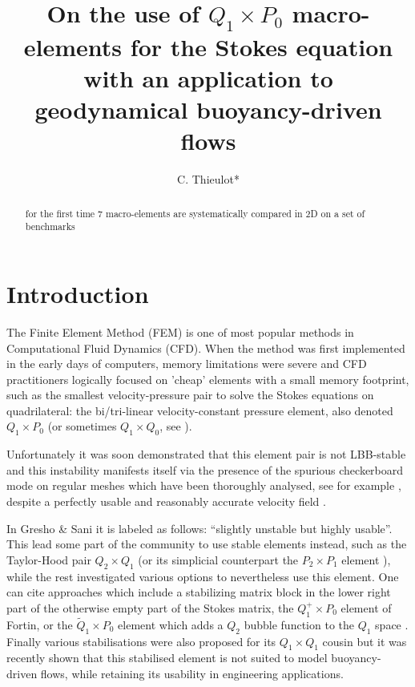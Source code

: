 \documentclass[a4paper]{article}
\title{
On the use of $Q_1\times P_0$ macro-elements for the Stokes equation with an application to 
geodynamical buoyancy-driven flows
}
\author{C. Thieulot*}
\begin{document}
\maketitle

\begin{abstract}
for the first time 7 macro-elements are systematically compared in 2D on a set of benchmarks
\end{abstract}

\tableofcontents

\section{Introduction} \label{sec1}


The Finite Element Method (FEM) is one of most popular methods in Computational Fluid Dynamics (CFD). 
When the method was first implemented 
in the early days of computers, memory limitations were severe and CFD practitioners logically 
focused on 'cheap' elements with a small memory footprint, such as the smallest velocity-pressure pair to 
solve the Stokes equations on quadrilateral: the bi/tri-linear velocity-constant pressure element, 
also denoted $Q_1 \times P_0$ (or sometimes $Q_1\times Q_0$, see \cite{grsa}). 

Unfortunately it was soon demonstrated that this element pair is not LBB-stable \cite{boni84,boni85} and this instability
manifests itself via the presence of the spurious checkerboard mode on regular meshes
which have been thoroughly analysed, see for example \cite{grsi94,chpc95,sagl81a,sagl81b}, 
despite a perfectly usable and reasonably accurate velocity field \cite{grsa,dohu03,bobf08,bobf13}.


In Gresho \& Sani \cite{grsa} it is labeled as follows: ``slightly unstable but highly usable''.
This lead some part of the community to use stable elements instead, such as the Taylor-Hood pair $Q_2\times Q_1$
(or its simplicial counterpart the $P_2\times P_1$ element \cite{thba25}), 
while the rest investigated various options to nevertheless use this element.
One can cite approaches which include a stabilizing matrix block in the lower right part of 
the otherwise empty part of the Stokes matrix\cite{kesi88,sike90,vibo92,nosi98},
the $Q_1^+\times P_0$ element of Fortin\cite{fort81}, or the $\tilde{Q}_1\times P_0$ element which adds 
a $Q_2$ bubble function to the $Q_1$ space \cite[p265]{brfo}.
Finally various stabilisations were also proposed for its 
$Q_1\times Q_1$ cousin \cite{dobo04,bodg06,busa13} but it was recently shown\cite{thba22} 
that this stabilised element is not suited to model buoyancy-driven flows, 
while retaining its usability in engineering applications.  
\end{document}
